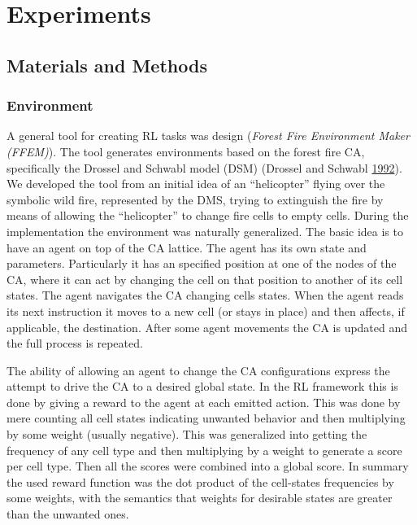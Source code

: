 \documentclass[
  openany]{book}
\begin{document}
\hypertarget{experiments}{%
\chapter{Experiments}\label{experiments}}

\hypertarget{materials-and-methods}{%
\section{Materials and Methods}\label{materials-and-methods}}

\hypertarget{environment}{%
\subsection{Environment}\label{environment}}

A general tool for creating RL tasks was design (\emph{Forest Fire Environment Maker (FFEM)}). The tool generates environments based on the forest fire CA, specifically the Drossel and Schwabl model (DSM) (Drossel and Schwabl \protect\hyperlink{ref-drossel1992self}{1992}). We developed the tool from an initial idea of an ``helicopter'' flying over the symbolic wild fire, represented by the DMS, trying to extinguish the fire by means of allowing the ``helicopter'' to change fire cells to empty cells. During the implementation the environment was naturally generalized. The basic idea is to have an agent on top of the CA lattice. The agent has its own state and parameters. Particularly it has an specified position at one of the nodes of the CA, where it can act by changing the cell on that position to another of its cell states. The agent navigates the CA changing cells states. When the agent reads its next instruction it moves to a new cell (or stays in place) and then affects, if applicable, the destination. After some agent movements the CA is updated and the full process is repeated.

The ability of allowing an agent to change the CA configurations express the attempt to drive the CA to a desired global state. In the RL framework this is done by giving a reward to the agent at each emitted action. This was done by mere counting all cell states indicating unwanted behavior and then multiplying by some weight (usually negative). This was generalized into getting the frequency of any cell type and then multiplying by a weight to generate a score per cell type. Then all the scores were combined into a global score. In summary the used reward function was the dot product of the cell-states frequencies by some weights, with the semantics that weights for desirable states are greater than the unwanted ones.
\end{document}
